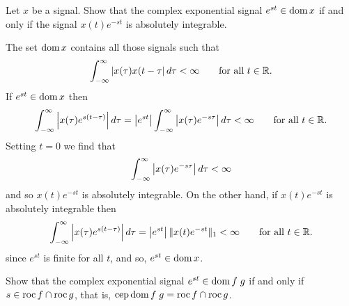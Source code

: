 \begin{excersizelist}
\begin{solution}
\begin{center}
\end{center}

\end{solution}

\begin{reallyhardexercise}
\item \label{exer:finhandroch} Let $x$ be a signal.  Show that the complex exponential signal $e^{st} \in \operatorname{dom} x$ if and only if the signal $x(t)e^{-st}$ is absolutely integrable.
\begin{solution}
The set $\operatorname{dom} x$ contains all those signals such that
\[
\int_{-\infty}^{\infty} \left\vert x(\tau) x(t - \tau \right\vert d\tau < \infty  \qquad \text{for all $t \in {\mathbb R}$}.
\]
If $e^{st} \in \operatorname{dom} x$ then
\[
\int_{-\infty}^{\infty} \left\vert x(\tau) e^{s(t - \tau)} \right\vert d\tau = \left\vert e^{st} \right\vert \int_{-\infty}^{\infty} \left\vert x(\tau) e^{-s \tau} \right\vert d\tau < \infty  \qquad \text{for all $t \in {\mathbb R}$}.
\]
Setting $t = 0$ we find that
\[
\int_{-\infty}^{\infty} \left\vert x(\tau) e^{-s \tau} \right\vert d\tau < \infty
\] 
and so $x(t) e^{-st}$ is absolutely integrable.  On the other hand, if $x(t) e^{-st}$ is absolutely integrable then
\[
\int_{-\infty}^{\infty} \left\vert x(\tau) e^{s(t - \tau)} \right\vert d\tau = \left\vert e^{st} \right\vert \| x(t) e^{-st}\|_1 < \infty  \qquad \text{for all $t \in {\mathbb R}$}.
\]
since $e^{st}$ is finite for all $t$, and so, $e^{st} \in \operatorname{dom} x$.
\end{solution}


\item \label{exer:domfgrocfrocg} Show that the complex exponential signal $e^{st} \in \operatorname{dom} f\;g$ if and only if $s \in \operatorname{roc} f \cap \operatorname{roc} g$, that is, $\operatorname{cep} \operatorname{dom} f\;g = \operatorname{roc} f \cap \operatorname{roc} g$.

\end{reallyhardexercise}

\end{excersizelist}

